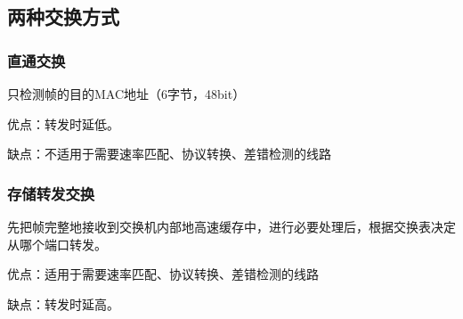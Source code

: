 \subsection{两种交换方式}

\subsubsection{直通交换}
只检测帧的目的MAC地址（6字节，48bit）

优点：转发时延低。

缺点：不适用于需要速率匹配、协议转换、差错检测的线路


\subsubsection{存储转发交换}
先把帧完整地接收到交换机内部地高速缓存中，进行必要处理后，根据交换表决定从哪个端口转发。

优点：适用于需要速率匹配、协议转换、差错检测的线路

缺点：转发时延高。


